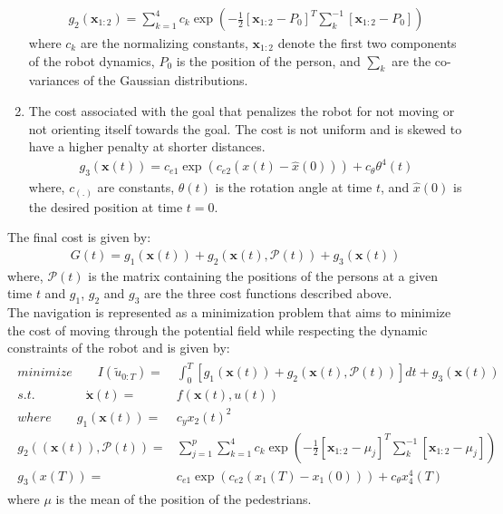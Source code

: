 \begin{enumerate}
	\begin{align}
	g_{2}(\textbf{x}_{1:2}) = \sum_{k=1}^{4}c_{k}\exp(-\frac{1}{2}[\textbf{x}_{1:2} - P_0]^{T}\sum^{-1}_{k}[\textbf{x}_{1:2} - P_0])
	\end{align} 
	where $c_{k}$ are the normalizing constants, $\textbf{x}_{1:2}$ denote the first two components of the robot dynamics, $P_0$ is the position of the person, and $\sum_k$ are the co-variances of the Gaussian distributions.
	\item The cost associated with the goal that penalizes the robot for not moving or not orienting itself towards the goal. The cost is not uniform and is skewed to have a higher penalty at shorter distances.
	\begin{align}
	g_{3}(\textbf{x}(t)) = c_{e1}\exp(c_{e2}(x(t) - \hat{x}(0))) + c_{\theta}\theta^{4}(t)
	\end{align}
	where, $c_{(.)}$ are constants, $\theta(t)$ is the rotation angle at time $t$, and $\hat{x}(0)$ is the desired position at time $t=0$.
\end{enumerate}

The final cost is given by: 
\begin{align}
G(t) = g_{1}(\textbf{x}(t)) + g_{2}(\textbf{x}(t), \mathcal{P}(t)) + g_{3}(\textbf{x}(t))
\end{align}
where, $\mathcal{P}(t)$ is the matrix containing the positions of the persons at a given time $t$ and $g_{1}$, $g_{2}$ and $g_{3}$ are the three cost functions described above.\\
The navigation is represented as a minimization problem that aims to minimize the cost of moving through the potential field while respecting the dynamic constraints of the robot and is given by:
\begin{align}
\label{eq:sven_optimziation}
\begin{split}
minimize \qquad I(\tilde{u}_{0:T}) = &\int_{0}^{T} [g_{1}(\textbf{x}(t)) + g_{2}(\textbf{x}(t), \mathcal{P}(t))]dt + g_{3}(\textbf{x}(t))\\
s.t. \qquad \qquad \dot{\textbf{x}}(t) = & f(\textbf{x}(t),u(t)) \\
where \qquad g_{1}(\textbf{x}(t)) = &c_{y}x_{2}(t)^{2}\\
g_{2}((\textbf{x}(t)), \mathcal{P}(t)) = &\sum_{j=1}^{p} \sum_{k=1}^{4} c_{k}\exp(-\frac{1}{2}[\textbf{x}_{1:2} - \mu_{j}]^{T}\sum^{-1}_{k}[\textbf{x}_{1:2} - \mu_{j}])\\
g_{3}(x(T)) = & c_{e1}\exp(c_{e2}(x_{1}(T) - x_{1}(0))) + c_{\theta}x_{4}^{4}(T)
\end{split}
\end{align}
where $\mu$ is the mean of the position of the pedestrians.\\

